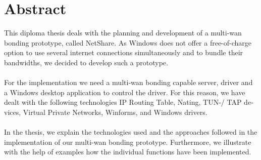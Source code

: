 \chapter{Abstract}

\begin{english} 
    This diploma thesis deals with the planning and development of a multi-wan bonding prototype, called NetShare. As  Windows does not offer a free-of-charge option to use several internet connections simultaneously and to bundle their bandwidths, we decided to develop such a prototype. 
    \\\\
    For the implementation we need a multi-wan bonding capable server, driver and a Windows desktop application to control the driver. For this reason, we have dealt with the following technologies IP Routing Table, Nating, TUN-/ TAP devices, Virtual Private Networks, Winforms, and Windows drivers.
    \\\\
    In the thesis, we explain the technologies used and the approaches followed in the implementation of our multi-wan bonding prototype. Furthermore, we illustrate with the help of examples how the individual functions have been implemented. 
\end{english}
